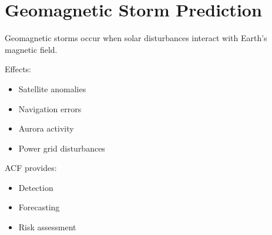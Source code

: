 \section{Geomagnetic Storm Prediction}


Geomagnetic storms occur when solar disturbances interact
with Earth's magnetic field.



Effects:


\begin{itemize}

\item Satellite anomalies

\item Navigation errors

\item Aurora activity

\item Power grid disturbances

\end{itemize}



ACF provides:


\begin{itemize}

\item Detection

\item Forecasting

\item Risk assessment

\end{itemize}
